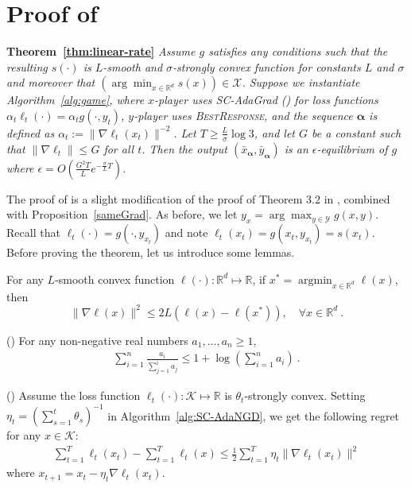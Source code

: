\documentclass[final,12pt]{colt2018} %
\def\reals{\mathbb{R}}
\def\reals{\mathbb{R}}
\def\K{\mathcal{K}}
\def\argmin{\mathop{\arg\min}}
\def\balpha{\boldsymbol{\alpha}}
\def\BR{\textsc{BestResponse}\xspace}
\newcommand{\yx}[1]{y_{#1}}
\newcommand{\XX}{\mathcal{X}}
\newcommand{\YY}{\mathcal{Y}}
\newcommand{\pr}[1]{\left(#1\right)}
\begin{document}
\section{Proof of } \label{app:linear-rate}

\textbf{Theorem~\ref{thm:linear-rate}}
\textit{ 
Assume $g$ satisfies any conditions such that the resulting $s(\cdot)$ is $L$-smooth and $\sigma$-strongly convex function for constants $L$ and $\sigma$ and moreover that $(\arg\min_{x\in \reals^d} s(x)) \in \XX$. Suppose we instantiate Algorithm~\ref{alg:game}, where $x$-player uses SC-AdaGrad () for loss functions $\alpha_t \ell_t(\cdot) = \alpha_t g(\cdot, y_t)$, $y$-player uses \BR, and the sequence $\balpha$ is defined as $\alpha_t := \| \nabla \ell_t(x_t) \|^{-2}$. Let $T \geq \frac L \sigma \log 3$, and let $G$ be a constant such that $\|\nabla \ell_t\| \le G$ for all $t$. Then the output $(\bar x_{\balpha}, \bar y_{\balpha})$ is an $\epsilon$-equilibrium of $g$ where $\epsilon = O\pr{\frac{G^2 T}{L}e^{-\frac{\sigma}{L}T}}$.
}


The proof of  is a slight modification of the proof of Theorem 3.2 in \cite{L17}, combined with Proposition~\ref{sameGrad}. As before, we let $\yx{x} = \arg\max_{y\in \YY} g(x,y)$. Recall that $\ell_t(\cdot) = g(\cdot, \yx{x_t})$ and note $\ell_t(x_t) = g(x_t,\yx{x_t}) = s(x_t)$.
Before proving the theorem, let us introduce some lemmas.

\begin{lemma} \label{lem:GSmooth}
For any $L$-smooth convex function $\ell(\cdot):\reals^d \mapsto \reals$, if $x^* =\argmin_{x\in \reals^d} \ell(x)$, then 
$$ \| \nabla \ell(x)\|^2 \le 2 L \left( \ell(x) - \ell(x^*)\right), \quad \forall x\in \reals^d~.$$
\end{lemma} 

\begin{lemma} (\cite{L17}) \label{lem:Log_sum} 
For any non-negative real numbers $a_1,\ldots, a_n\geq 1$,
\begin{align*}
\sum_{i=1}^n \frac{a_i}{\sum_{j=1}^i a_j} 
\le 
1+\log\left( \sum_{i=1}^n a_i\right) ~.
\end{align*}
\end{lemma}

\begin{lemma} (\cite{hazan2007logarithmic,L17}) \label{osc}
Assume the loss function $\ell_t(\cdot): \K\mapsto \reals$ is $\theta_t$-strongly convex. Setting $\eta_t = \pr{\sum_{s=1}^t \theta_s}^{{-1}}$ in Algorithm~\ref{alg:SC-AdaNGD}, we get the following regret for any $x \in \K$:
  \begin{align}
  \sum_{t=1}^T \ell_t(x_t) - \sum_{t=1}^T \ell_t(x) \le \frac{1}{2}\sum_{t=1}^T \eta_t \| \nabla \ell_t(x_t) \|^2
  \end{align}
  where $x_{t+1} = x_t - \eta_t  \nabla \ell_t(x_t)$.
\end{lemma}
\end{document}
